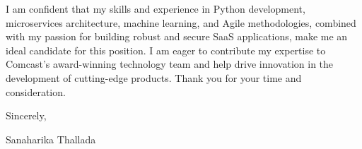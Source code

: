 \documentclass[letterpaper,11pt]{article}
\begin{document}
I am confident that my skills and experience in Python development, microservices architecture, machine learning, and Agile methodologies, combined with my passion for building robust and secure SaaS applications, make me an ideal candidate for this position. I am eager to contribute my expertise to Comcast's award-winning technology team and help drive innovation in the development of cutting-edge products. Thank you for your time and consideration.

Sincerely,


Sanaharika Thallada
\end{document}
